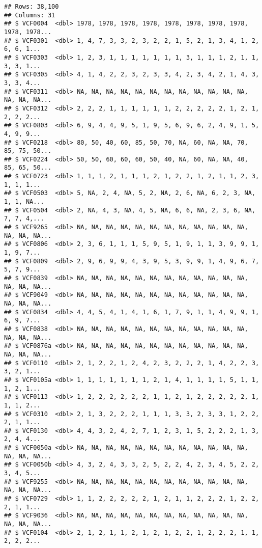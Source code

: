 \documentclass[
]{article}
\begin{document}
\begin{verbatim}
## Rows: 38,100
## Columns: 31
## $ VCF0004  <dbl> 1978, 1978, 1978, 1978, 1978, 1978, 1978, 1978, 1978, 1978...
## $ VCF0301  <dbl> 1, 4, 7, 3, 3, 2, 3, 2, 2, 1, 5, 2, 1, 3, 4, 1, 2, 6, 6, 1...
## $ VCF0303  <dbl> 1, 2, 3, 1, 1, 1, 1, 1, 1, 1, 3, 1, 1, 1, 2, 1, 1, 3, 3, 1...
## $ VCF0305  <dbl> 4, 1, 4, 2, 2, 3, 2, 3, 3, 4, 2, 3, 4, 2, 1, 4, 3, 3, 3, 4...
## $ VCF0311  <dbl> NA, NA, NA, NA, NA, NA, NA, NA, NA, NA, NA, NA, NA, NA, NA...
## $ VCF0312  <dbl> 2, 2, 2, 1, 1, 1, 1, 1, 1, 2, 2, 2, 2, 2, 1, 2, 1, 2, 2, 2...
## $ VCF0803  <dbl> 6, 9, 4, 4, 9, 5, 1, 9, 5, 6, 9, 6, 2, 4, 9, 1, 5, 4, 9, 9...
## $ VCF0218  <dbl> 80, 50, 40, 60, 85, 50, 70, NA, 60, NA, NA, 70, 85, 75, 50...
## $ VCF0224  <dbl> 50, 50, 60, 60, 60, 50, 40, NA, 60, NA, NA, 40, 85, 65, 50...
## $ VCF0723  <dbl> 1, 1, 1, 2, 1, 1, 1, 2, 1, 2, 2, 1, 2, 1, 1, 2, 3, 1, 1, 1...
## $ VCF0503  <dbl> 5, NA, 2, 4, NA, 5, 2, NA, 2, 6, NA, 6, 2, 3, NA, 1, 1, NA...
## $ VCF0504  <dbl> 2, NA, 4, 3, NA, 4, 5, NA, 6, 6, NA, 2, 3, 6, NA, 7, 7, 4,...
## $ VCF9265  <dbl> NA, NA, NA, NA, NA, NA, NA, NA, NA, NA, NA, NA, NA, NA, NA...
## $ VCF0806  <dbl> 2, 3, 6, 1, 1, 1, 5, 9, 5, 1, 9, 1, 1, 3, 9, 9, 1, 1, 9, 7...
## $ VCF0809  <dbl> 2, 9, 6, 9, 9, 4, 3, 9, 5, 3, 9, 9, 1, 4, 9, 6, 7, 5, 7, 9...
## $ VCF0839  <dbl> NA, NA, NA, NA, NA, NA, NA, NA, NA, NA, NA, NA, NA, NA, NA...
## $ VCF9049  <dbl> NA, NA, NA, NA, NA, NA, NA, NA, NA, NA, NA, NA, NA, NA, NA...
## $ VCF0834  <dbl> 4, 4, 5, 4, 1, 4, 1, 6, 1, 7, 9, 1, 1, 4, 9, 9, 1, 6, 9, 7...
## $ VCF0838  <dbl> NA, NA, NA, NA, NA, NA, NA, NA, NA, NA, NA, NA, NA, NA, NA...
## $ VCF0876a <dbl> NA, NA, NA, NA, NA, NA, NA, NA, NA, NA, NA, NA, NA, NA, NA...
## $ VCF0110  <dbl> 2, 1, 2, 2, 1, 2, 4, 2, 3, 2, 2, 2, 1, 4, 2, 2, 3, 3, 2, 1...
## $ VCF0105a <dbl> 1, 1, 1, 1, 1, 1, 1, 2, 1, 4, 1, 1, 1, 1, 5, 1, 1, 1, 2, 1...
## $ VCF0113  <dbl> 1, 2, 2, 2, 2, 2, 2, 1, 1, 2, 1, 2, 2, 2, 2, 2, 1, 1, 1, 2...
## $ VCF0310  <dbl> 2, 1, 3, 2, 2, 2, 1, 1, 1, 3, 3, 2, 3, 3, 1, 2, 2, 2, 1, 1...
## $ VCF0130  <dbl> 4, 4, 3, 2, 4, 2, 7, 1, 2, 3, 1, 5, 2, 2, 2, 1, 3, 2, 4, 4...
## $ VCF0050a <dbl> NA, NA, NA, NA, NA, NA, NA, NA, NA, NA, NA, NA, NA, NA, NA...
## $ VCF0050b <dbl> 4, 3, 2, 4, 3, 3, 2, 5, 2, 2, 4, 2, 3, 4, 5, 2, 2, 3, 4, 5...
## $ VCF9255  <dbl> NA, NA, NA, NA, NA, NA, NA, NA, NA, NA, NA, NA, NA, NA, NA...
## $ VCF0729  <dbl> 1, 1, 2, 2, 2, 2, 2, 1, 2, 1, 1, 2, 2, 2, 1, 2, 2, 2, 1, 1...
## $ VCF9036  <dbl> NA, NA, NA, NA, NA, NA, NA, NA, NA, NA, NA, NA, NA, NA, NA...
## $ VCF0104  <dbl> 2, 1, 2, 1, 1, 2, 1, 2, 1, 2, 2, 1, 2, 2, 2, 1, 1, 2, 2, 2...
\end{verbatim}
\end{document}
